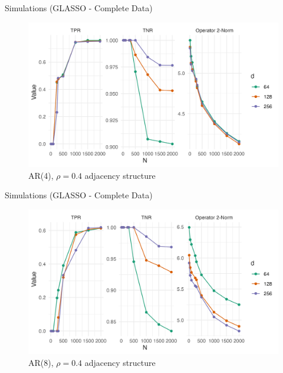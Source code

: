 \documentclass{beamer}
\begin{document}
\begin{frame}{Simulations (GLASSO - Complete Data)}
    \begin{figure}
        \centering 
        \includegraphics[scale=0.65]{glasso_complete_fixN_b4.png}
        \caption{AR(4), $\rho=0.4$ adjacency structure}
    \end{figure}
\end{frame}


\begin{frame}{Simulations (GLASSO - Complete Data)}
    \begin{figure}
        \centering 
        \includegraphics[scale=0.65]{glasso_complete_fixN_b8.png}
        \caption{AR(8), $\rho=0.4$ adjacency structure}
    \end{figure}
\end{frame}
\end{document}
